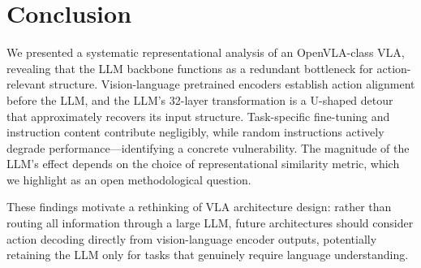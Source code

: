 \documentclass[letterpaper]{article}
\begin{document}
\section{Conclusion}
\label{sec:conclusion}

We presented a systematic representational analysis of an OpenVLA-class VLA, revealing that the LLM backbone functions as a redundant bottleneck for action-relevant structure.
Vision-language pretrained encoders establish action alignment before the LLM, and the LLM's 32-layer transformation is a U-shaped detour that approximately recovers its input structure.
Task-specific fine-tuning and instruction content contribute negligibly, while random instructions actively degrade performance---identifying a concrete vulnerability.
The magnitude of the LLM's effect depends on the choice of representational similarity metric, which we highlight as an open methodological question.

These findings motivate a rethinking of VLA architecture design: rather than routing all information through a large LLM, future architectures should consider action decoding directly from vision-language encoder outputs, potentially retaining the LLM only for tasks that genuinely require language understanding.


\small

\end{document}
